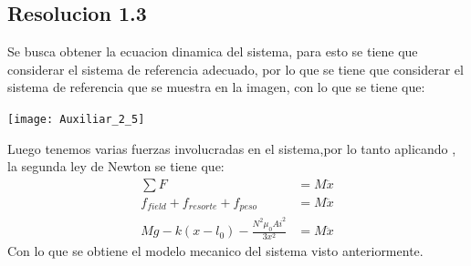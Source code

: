 \documentclass[
  11pt,
  letterpaper,
   addpoints,
   answers
  ]{exam}
\begin{document}
\begin{questions}
\begin{solution}
        \subsection*{Resolucion 1.3}
        Se busca obtener la ecuacion dinamica del sistema, para esto se tiene que considerar el sistema de referencia adecuado, por lo que se tiene que considerar el sistema de referencia que se muestra en la imagen, con lo que se tiene que:
        \begin{center}
            \texttt{[image: Auxiliar\_2\_5]}
        \end{center}
        Luego tenemos varias fuerzas involucradas en el sistema,por lo tanto aplicando , la segunda ley de Newton se tiene que:
        \begin{align}
            \sum F &= M\ddot{x}\\
            f_{field} + f_{resorte} + f_{peso} &= M\ddot{x}\\
            Mg - k(x-l_{0}) - \frac{N^{2}\mu_{0}Ai^{2}}{3x^{2}} &= M\ddot{x}
        \end{align}
        Con lo que se obtiene el modelo mecanico del sistema visto anteriormente.

\end{solution}
\end{questions}
\end{document}
